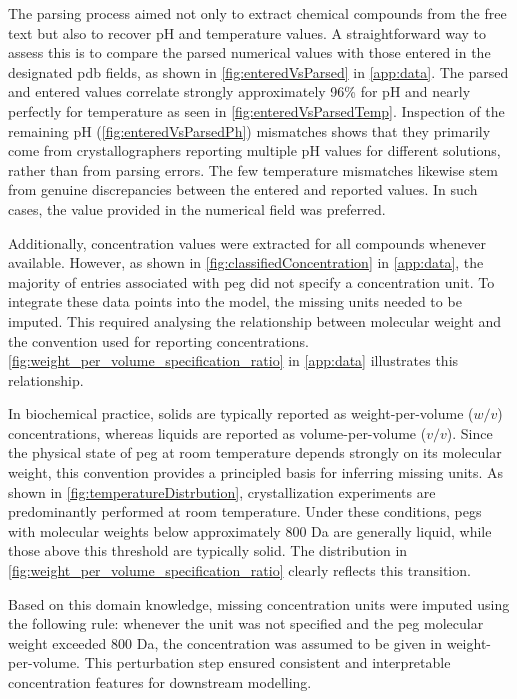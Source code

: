 The parsing process aimed not only to extract chemical compounds from the free text but also to recover pH and temperature values. A straightforward way to assess this is to compare the parsed numerical values with those entered in the designated \gls{pdb} fields, as shown in \autoref{fig:enteredVsParsed} in \autoref{app:data}. The parsed and entered values correlate strongly approximately 96\% for pH and nearly perfectly for temperature as seen in \autoref{fig:enteredVsParsedTemp}. Inspection of the remaining pH (\autoref{fig:enteredVsParsedPh}) mismatches shows that they primarily come from crystallographers reporting multiple pH values for different solutions, rather than from parsing errors. The few temperature mismatches likewise stem from genuine discrepancies between the entered and reported values. In such cases, the value provided in the numerical field was preferred.

Additionally, concentration values were extracted for all compounds whenever available. However, as shown in \autoref{fig:classifiedConcentration} in \autoref{app:data}, the majority of entries associated with \gls{peg} did not specify a concentration unit. To integrate these data points into the model, the missing units needed to be imputed. This required analysing the relationship between molecular weight and the convention used for reporting concentrations. \autoref{fig:weight_per_volume_specification_ratio} in \autoref{app:data} illustrates this relationship.

In biochemical practice, solids are typically reported as weight-per-volume ($w/v$) concentrations, whereas liquids are reported as volume-per-volume ($v/v$). Since the physical state of \gls{peg} at room temperature depends strongly on its molecular weight, this convention provides a principled basis for inferring missing units. As shown in \autoref{fig:temperatureDistrbution}, crystallization experiments are predominantly performed at room temperature. Under these conditions, \glspl{peg} with molecular weights below approximately 800 Da are generally liquid, while those above this threshold are typically solid. The distribution in \autoref{fig:weight_per_volume_specification_ratio} clearly reflects this transition.

Based on this domain knowledge, missing concentration units were imputed using the following rule: whenever the unit was not specified and the \gls{peg} molecular weight exceeded 800 Da, the concentration was assumed to be given in weight-per-volume. This perturbation step ensured consistent and interpretable concentration features for downstream modelling.

